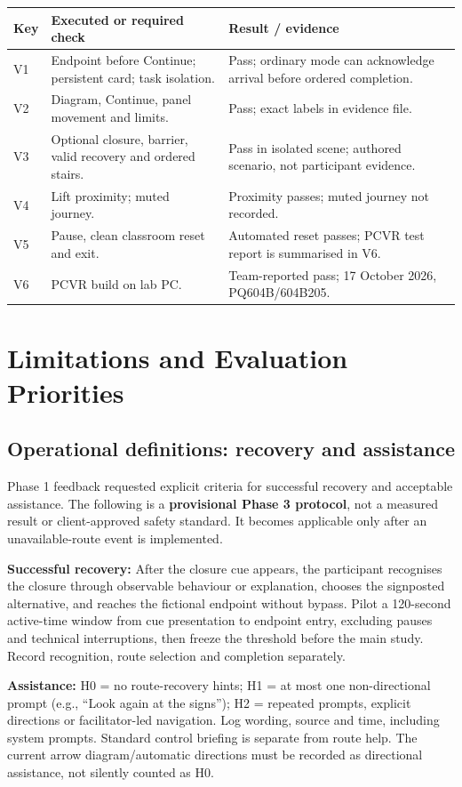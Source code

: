 \documentclass[12pt,a4paper]{article}
\begin{document}
\begin{tabularx}{\textwidth}{@{}p{0.8cm}YY@{}}
\toprule
\textbf{Key} & \textbf{Executed or required check} & \textbf{Result / evidence} \\
\midrule
V1 & Endpoint before Continue; persistent card; task isolation. & Pass; ordinary mode can acknowledge arrival before ordered completion. \\
V2 & Diagram, Continue, panel movement and limits. & Pass; exact labels in evidence file. \\
V3 & Optional closure, barrier, valid recovery and ordered stairs. & Pass in isolated scene; authored scenario, not participant evidence. \\
V4 & Lift proximity; muted journey. & Proximity passes; muted journey not recorded. \\
V5 & Pause, clean classroom reset and exit. & Automated reset passes; PCVR test report is summarised in V6. \\
V6 & PCVR build on lab PC. & Team-reported pass; 17 October 2026, PQ604B/604B205. \\
\bottomrule
\end{tabularx}

\newpage
\section{Limitations and Evaluation Priorities}
\subsection{Operational definitions: recovery and assistance}
Phase 1 feedback requested explicit criteria for successful recovery and
acceptable assistance. The following is a \textbf{provisional Phase 3 protocol},
not a measured result or client-approved safety standard. It becomes applicable
only after an unavailable-route event is implemented.

\textbf{Successful recovery:} After the closure cue appears, the participant
recognises the closure through observable behaviour or explanation, chooses
the signposted alternative, and reaches the fictional endpoint without bypass.
Pilot a 120-second active-time window from cue presentation to endpoint entry,
excluding pauses and technical interruptions, then freeze the threshold before
the main study. Record recognition, route selection and completion separately.

\textbf{Assistance:} H0 = no route-recovery hints; H1 = at most one
non-directional prompt (e.g., ``Look again at the signs''); H2 = repeated
prompts, explicit directions or facilitator-led navigation. Log wording,
source and time, including system prompts. Standard control briefing is
separate from route help. The current arrow diagram/automatic directions must
be recorded as directional assistance, not silently counted as H0.
\end{document}
